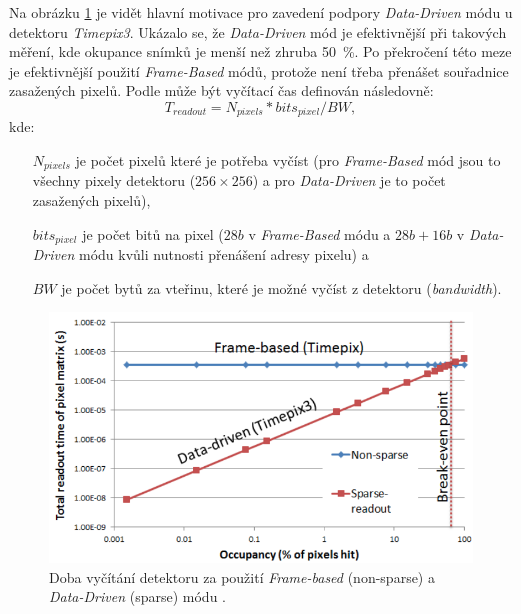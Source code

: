 Na obrázku \ref{fig:det:frame_vs_event_driven} je vidět hlavní motivace pro zavedení podpory \textit{Data-Driven} módu u detektoru \textit{Timepix3}. Ukázalo se, že \textit{Data-Driven} mód je efektivnější při takových měření, kde okupance snímků je menší než zhruba 50~\%. Po překročení této meze je efektivnější použití \textit{Frame-Based} módů, protože není třeba přenášet souřadnice zasažených pixelů. Podle \cite{timepix3} může být vyčítací čas definován následovně:
\begin{equation}\label{eq:det:readout_time}
	T_{readout} = N_{pixels}*bits_{pixel}/BW,
\end{equation}
kde:
\begin{changemargin}{1.5cm}{1cm} 
	\begin{itemize}
		\item[$N_{pixels}$] je počet pixelů které je potřeba vyčíst (pro \textit{Frame-Based} mód jsou to všechny pixely detektoru ($256\times256$) a pro \textit{Data-Driven} je to počet zasažených pixelů),
		\item[$bits_{pixel}$] je počet bitů na pixel ($28 b$ v \textit{Frame-Based} módu a $28b + 16b$ v \textit{Data-Driven} módu kvůli nutnosti přenášení adresy pixelu) a
		\item[$BW$] je počet bytů za vteřinu, které je možné vyčíst z detektoru (\textit{bandwidth}). 
	\end{itemize}
\end{changemargin}

\begin{figure}[th]
	\begin{center}
		\includegraphics[width=14cm]{figures/det_frame_vs_event_driven.png}
		\caption{Doba vyčítání detektoru za použití \textit{Frame-based} (non-sparse) a \textit{Data-Driven} (sparse) módu \cite{timepix3}.}
		\label{fig:det:frame_vs_event_driven}
	\end{center}
\end{figure}

